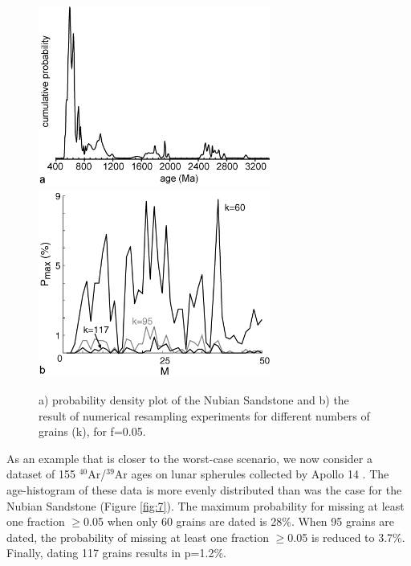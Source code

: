 \documentclass[12]{article}
\begin{document}
 \begin{figure}[here]
   \centering
   \includegraphics[width = 3in]{fig6a.jpg}
   \includegraphics[width = 3in]{fig6b.jpg}
   \caption{a) probability density plot of the Nubian Sandstone
   \cite{avigad2003}  and  b)   the  result  of  numerical  resampling
    experiments for different numbers of grains (k), for f=0.05.}
   \label{fig:6}
 \end{figure}

As  an example  that  is closer  to  the worst-case  scenario, we  now
consider a dataset of  155 $^{40}$Ar/$^{39}$Ar ages on lunar spherules
collected by Apollo 14  \cite{culler2000}.  The age-histogram of these
data  is more  evenly distributed  than was  the case  for  the Nubian
Sandstone (Figure  \ref{fig:7}).  The maximum  probability for missing
at  least one fraction  $\geq$0.05 when  only 60  grains are  dated is
28\%.  When 95  grains are dated, the probability  of missing at least
one  fraction $\geq$0.05  is reduced  to 3.7\%.   Finally,  dating 117
grains results in p=1.2\%.
\end{document}
